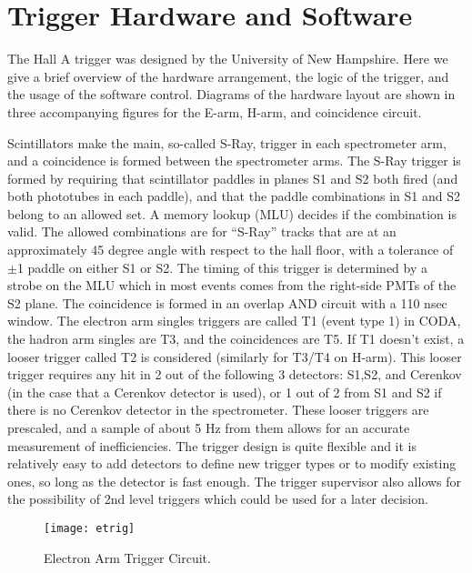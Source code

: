 \section{Trigger Hardware and Software}

\par
The Hall A trigger was designed by the
University of New Hampshire.
Here we give a brief overview of the 
hardware arrangement,
the logic of the trigger, and the usage
of the software control.
Diagrams of the hardware layout are shown in
three accompanying 
figures for the E-arm, H-arm,
and coincidence circuit.

\par
Scintillators make the main, so-called S-Ray,
trigger in each spectrometer arm, and a
coincidence is formed between the spectrometer
arms.  The S-Ray trigger is formed by
requiring that scintillator paddles in
planes S1 and S2 both fired (and both phototubes
in each paddle), and that the paddle
combinations in S1 and S2 belong to an
allowed set.  A memory lookup (MLU) decides
if the combination is valid.  The allowed
combinations are for ``S-Ray'' tracks that are at
an approximately 45 degree angle with respect
to the hall floor, with a tolerance of $\pm$1
paddle on either S1 or S2.  The timing of
this trigger is determined by a strobe on
the MLU which in most events comes from the 
right-side PMTs of the S2 plane.  The coincidence
is formed in an overlap AND circuit with
a 110 nsec window.  The electron arm singles
triggers are called T1 (event type 1) in CODA,
the hadron arm singles are T3, and the coincidences
are T5.  If T1 doesn't exist, a looser trigger
called T2 is considered (similarly for T3/T4 on
H-arm).  This looser trigger requires any hit
in 2 out of the following 3 detectors: 
S1,S2, and Cerenkov
(in the case that a Cerenkov detector is used), 
or 1 out of 2 from S1 and S2 if there is no
Cerenkov detector in the spectrometer.  
These looser triggers are prescaled,
and a sample of about 5 Hz from them allows for
an accurate measurement of inefficiencies.
The trigger design is quite flexible and it
is relatively easy to add detectors to define
new trigger types or to modify existing ones,
so long as the detector is fast enough.
The trigger supervisor also allows for the
possibility of 2nd level triggers which could
be used for a later decision.

\begin{figure}
\begin{center}
\texttt{[image: etrig]}
{\linespread{1.}
\caption[Data Acquisition: Electron Arm Trigger]{Electron Arm Trigger Circuit.}
\label{fig:etrig}}
\end{center}
\end{figure}

